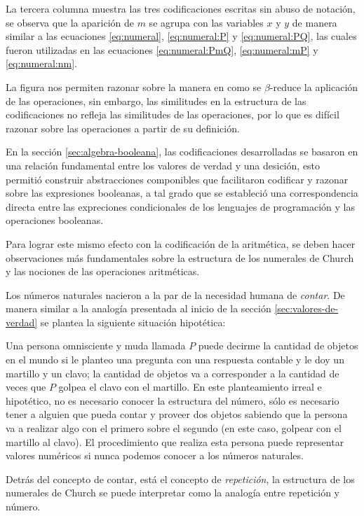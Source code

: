 La tercera columna muestra las tres codificaciones escritas sin abuso de notación, se observa que la aparición de \( m \) se agrupa con las variables \( x \) y \( y \) de manera similar a las ecuaciones \eqref{eq:numeral}, \eqref{eq:numeral:P} y \eqref{eq:numeral:PQ}, las cuales fueron utilizadas en las ecuaciones \eqref{eq:numeral:PmQ}, \eqref{eq:numeral:mP} y \eqref{eq:numeral:nm}.

La figura nos permiten razonar sobre la manera en como se \( β \)-reduce la aplicación de las operaciones, sin embargo, las similitudes en la estructura de las codificaciones no refleja las similitudes de las operaciones, por lo que es difícil razonar sobre las operaciones a partir de su definición.

En la sección \ref{sec:algebra-booleana}, las codificaciones desarrolladas se basaron en una relación fundamental entre los valores de verdad y una desición, esto permitió construir abstracciones componibles que facilitaron codificar y razonar sobre las expresiones booleanas, a tal grado que se estableció una correspondencia directa entre las expreciones condicionales de los lenguajes de programación y las operaciones booleanas.

Para lograr este mismo efecto con la codificación de la aritmética, se deben hacer observaciones más fundamentales sobre la estructura de los numerales de Church y las nociones de las operaciones aritméticas.

Los números naturales nacieron a la par de la necesidad humana de \emph{contar}. De manera similar a la analogía presentada al inicio de la sección \ref{sec:valores-de-verdad} se plantea la siguiente situación hipotética:

Una persona omnisciente y muda llamada \( P \) puede decirme la cantidad de objetos en el mundo si le planteo una pregunta con una respuesta contable y le doy un martillo y un clavo; la cantidad de objetos va a corresponder a la cantidad de veces que \( P \) golpea el clavo con el martillo. En este planteamiento irreal e hipotético, no es necesario conocer la estructura del número, sólo es necesario tener a alguien que pueda contar y proveer dos objetos sabiendo que la persona va a realizar algo con el primero sobre el segundo (en este caso, golpear con el martillo al clavo). El procedimiento que realiza esta persona puede representar valores numéricos si nunca podemos conocer a los números naturales.

Detrás del concepto de contar, está el concepto de \emph{repetición}, la estructura de los numerales de Church se puede interpretar como la analogía entre repetición y número.


